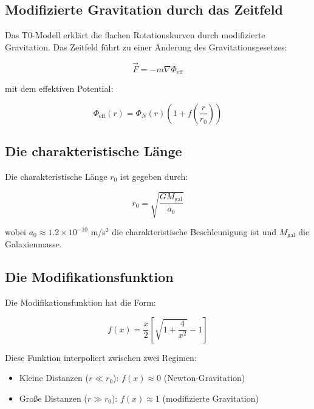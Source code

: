 \documentclass[12pt,a4paper]{report}
\begin{document}
	\subsection{Modifizierte Gravitation durch das Zeitfeld}
	
	Das T0-Modell erklärt die flachen Rotationskurven durch modifizierte Gravitation. Das Zeitfeld führt zu einer Änderung des Gravitationsgesetzes:
	
	\begin{equation}
		\vec{F} = -m\nabla\Phi_{\text{eff}}
	\end{equation}
	
	mit dem effektiven Potential:
	
	\begin{equation}
		\Phi_{\text{eff}}(r) = \Phi_N(r)\left(1 + f\left(\frac{r}{r_0}\right)\right)
	\end{equation}
	
	\subsection{Die charakteristische Länge}
	
	Die charakteristische Länge $r_0$ ist gegeben durch:
	
	\begin{equation}
		r_0 = \sqrt{\frac{GM_{\text{gal}}}{a_0}}
	\end{equation}
	
	wobei $a_0 \approx 1.2 \times 10^{-10}$ m/s$^2$ die charakteristische Beschleunigung ist und $M_{\text{gal}}$ die Galaxienmasse.
	
	\subsection{Die Modifikationsfunktion}
	
	Die Modifikationsfunktion hat die Form:
	
	\begin{equation}
		f(x) = \frac{x}{2}\left[\sqrt{1 + \frac{4}{x^2}} - 1\right]
	\end{equation}
	
	Diese Funktion interpoliert zwischen zwei Regimen:
	\begin{itemize}
		\item Kleine Distanzen ($r \ll r_0$): $f(x) \approx 0$ (Newton-Gravitation)
		\item Große Distanzen ($r \gg r_0$): $f(x) \approx 1$ (modifizierte Gravitation)
	\end{itemize}
	
\end{document}
